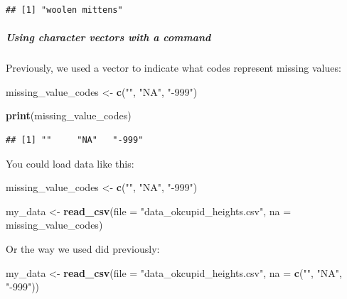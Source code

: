 \documentclass[
]{krantz}
\makeatletter
\newenvironment{Shaded}{\begin{snugshade}}{\end{snugshade}}
\newcommand{\DataTypeTok}[1]{\textcolor[rgb]{0.27,0.27,0.27}{#1}}
\newcommand{\KeywordTok}[1]{\textcolor[rgb]{0.27,0.27,0.27}{\textbf{#1}}}
\newcommand{\NormalTok}[1]{#1}
\newcommand{\StringTok}[1]{\textcolor[rgb]{0.5,0.5,0.5}{#1}}
\newenvironment{kframe}{%
\medskip{}
\setlength{\fboxsep}{.8em}
 \def\at@end@of@kframe{}%
 \ifinner\ifhmode%
  \def\at@end@of@kframe{\end{minipage}}%
  \begin{minipage}{\columnwidth}%
 \fi\fi%
 \def\FrameCommand##1{\hskip\@totalleftmargin \hskip-\fboxsep
 \colorbox{shadecolor}{##1}\hskip-\fboxsep
     \hskip-\linewidth \hskip-\@totalleftmargin \hskip\columnwidth}%
 \MakeFramed {\advance\hsize-\width
   \@totalleftmargin\z@ \linewidth\hsize
   \@setminipage}}%
 {\par\unskip\endMakeFramed%
 \at@end@of@kframe}
\renewenvironment{Shaded}{\begin{kframe}}{\end{kframe}}
\makeatother
\begin{document}
\begin{verbatim}
## [1] "woolen mittens"
\end{verbatim}

\hypertarget{using-character-vectors-with-a-command}{%
\subparagraph{Using character vectors with a command}\label{using-character-vectors-with-a-command}}

Previously, we used a vector to indicate what codes represent missing values:

\begin{Shaded}
\begin{Highlighting}[]
\NormalTok{missing_value_codes <-}\StringTok{ }\KeywordTok{c}\NormalTok{(}\StringTok{""}\NormalTok{, }\StringTok{"NA"}\NormalTok{, }\StringTok{"-999"}\NormalTok{)}

\KeywordTok{print}\NormalTok{(missing_value_codes)}
\end{Highlighting}
\end{Shaded}

\begin{verbatim}
## [1] ""     "NA"   "-999"
\end{verbatim}

You could load data like this:

\begin{Shaded}
\begin{Highlighting}[]
\NormalTok{missing_value_codes <-}\StringTok{ }\KeywordTok{c}\NormalTok{(}\StringTok{""}\NormalTok{, }\StringTok{"NA"}\NormalTok{, }\StringTok{"-999"}\NormalTok{)}

\NormalTok{my_data <-}\StringTok{ }\KeywordTok{read_csv}\NormalTok{(}\DataTypeTok{file =} \StringTok{"data_okcupid_heights.csv"}\NormalTok{, }
                    \DataTypeTok{na =}\NormalTok{ missing_value_codes)}
\end{Highlighting}
\end{Shaded}

Or the way we used did previously:

\begin{Shaded}
\begin{Highlighting}[]
\NormalTok{my_data <-}\StringTok{ }\KeywordTok{read_csv}\NormalTok{(}\DataTypeTok{file =} \StringTok{"data_okcupid_heights.csv"}\NormalTok{, }
                    \DataTypeTok{na =} \KeywordTok{c}\NormalTok{(}\StringTok{""}\NormalTok{, }\StringTok{"NA"}\NormalTok{, }\StringTok{"-999"}\NormalTok{))}
\end{Highlighting}
\end{Shaded}
\end{document}
